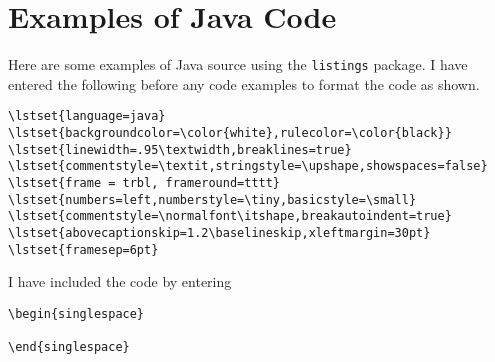 \chapter{Examples of Java Code}
Here are some examples of Java source using the \texttt{listings} package. I have entered the following before any code examples to format the code as shown.

\begin{singlespace}
\begin{verbatim}
\lstset{language=java}
\lstset{backgroundcolor=\color{white},rulecolor=\color{black}}
\lstset{linewidth=.95\textwidth,breaklines=true}
\lstset{commentstyle=\textit,stringstyle=\upshape,showspaces=false}
\lstset{frame = trbl, frameround=tttt}
\lstset{numbers=left,numberstyle=\tiny,basicstyle=\small}
\lstset{commentstyle=\normalfont\itshape,breakautoindent=true}
\lstset{abovecaptionskip=1.2\baselineskip,xleftmargin=30pt}
\lstset{framesep=6pt}
\end{verbatim}
\end{singlespace}

I have included the code by entering
\begin{singlespace}
\begin{verbatim}
\begin{singlespace}

\end{singlespace}
\end{verbatim}
\end{singlespace}

\lstset{language=java}
\lstset{linewidth=.95\textwidth,breaklines=true}
\lstset{commentstyle=\textit,stringstyle=\upshape,showspaces=false}
\lstset{frame = trbl, frameround=tttt}
\lstset{numbers=left,numberstyle=\tiny,basicstyle=\small}
\lstset{commentstyle=\normalfont\itshape,breakautoindent=true}
\lstset{abovecaptionskip=1.2\baselineskip,xleftmargin=30pt}
\lstset{framesep=6pt}

\begin{singlespace}

\end{singlespace}
\newpage

\begin{singlespace}

\end{singlespace}

\begin{singlespace}

\end{singlespace}
